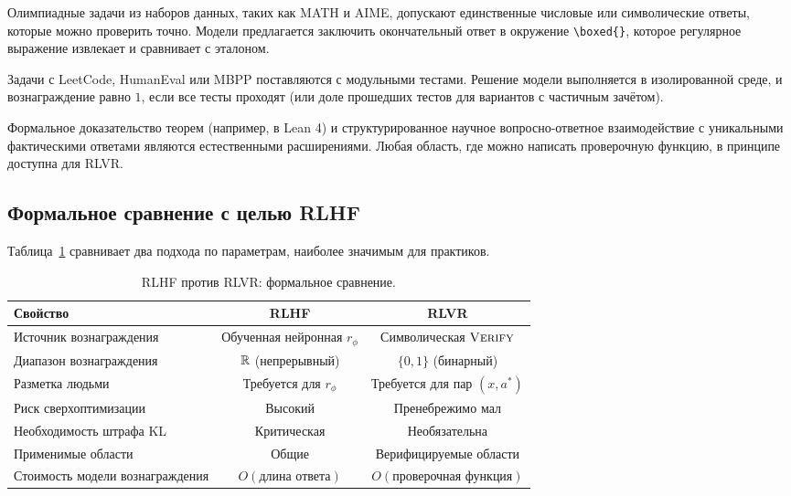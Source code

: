 \begin{description}[leftmargin=!,labelwidth=3.5cm]
\item[Математика] Олимпиадные задачи из наборов данных, таких как
  MATH и AIME, допускают единственные числовые или символические ответы, которые можно
  проверить точно. Модели предлагается заключить окончательный
  ответ в окружение \texttt{\textbackslash boxed\{\}}, которое регулярное
  выражение извлекает и сравнивает с эталоном.

\item[Генерация кода] Задачи с LeetCode, HumanEval или MBPP
  поставляются с модульными тестами. Решение модели выполняется в изолированной среде,
  и вознаграждение равно $1$, если все тесты проходят (или доле прошедших тестов
  для вариантов с частичным зачётом).

\item[Наука и логика] Формальное доказательство теорем (например, в Lean 4) и
  структурированное научное вопросно-ответное взаимодействие с уникальными фактическими ответами
  являются естественными расширениями. Любая область, где можно написать проверочную функцию,
  в принципе доступна для RLVR.
\end{description}

\subsection{Формальное сравнение с целью RLHF}
\label{subsec:rlvr-vs-rlhf}

Таблица~\ref{tab:rlhf-vs-rlvr} сравнивает два подхода по
параметрам, наиболее значимым для практиков.

\begin{table}[ht]
\centering
\small
\caption{RLHF против RLVR: формальное сравнение.}
\label{tab:rlhf-vs-rlvr}
\begin{tabular}{@{}lcc@{}}
\toprule
\textbf{Свойство} & \textbf{RLHF} & \textbf{RLVR} \\
\midrule
Источник вознаграждения & Обученная нейронная $r_\phi$ & Символическая $\textsc{Verify}$ \\
Диапазон вознаграждения & $\mathbb{R}$ (непрерывный) & $\{0, 1\}$ (бинарный) \\
Разметка людьми & Требуется для $r_\phi$ & Требуется для пар $(x, a^*)$ \\
Риск сверхоптимизации & Высокий & Пренебрежимо мал \\
Необходимость штрафа KL & Критическая & Необязательна \\
Применимые области & Общие & Верифицируемые области \\
Стоимость модели вознаграждения & $O(\mbox{длина ответа})$ & $O(\mbox{проверочная функция})$ \\
\bottomrule
\end{tabular}
\end{table}

